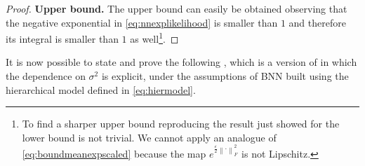 \documentclass[a4paper, 11pt, reqno]{amsart}
\theoremstyle{plain}
\theoremstyle{remark}
\theoremstyle{definition}
\newcommand{\norm}[1]{\left\lVert#1\right\rVert}
\let\epsilon\varepsilon
\begin{document}
\begin{proof}
	\textbf{Upper bound.} The upper bound can easily be obtained observing that the negative exponential in \cref{eq:nnexplikelihood} is smaller than $1$ and therefore its integral is smaller than $1$ as well\footnote{To find a sharper upper bound reproducing the result just showed for the lower bound is not trivial. We cannot apply an analogue of \cref{eq:boundmeanexpscaled} because the map $e^{\frac{\epsilon}{2} \norm{\bm{\cdot}}_F^2}$ is not Lipschitz.}.
\end{proof}

It is now possible to state and prove the following , which is a version of  in which the dependence on $\sigma^2$ is explicit, under the assumptions of BNN built using the hierarchical model defined in \cref{eq:hiermodel}.
\end{document}
